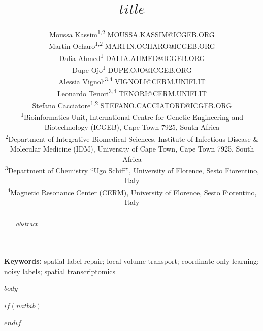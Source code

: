 \documentclass[twoside,11pt]{article}
\begin{document}
\raggedbottom

\title{$title$}

\author{%
\name Moussa Kassim\textsuperscript{1,2} \email MOUSSA.KASSIM@ICGEB.ORG \\
\name Martin Ocharo\textsuperscript{1,2} \email MARTIN.OCHARO@ICGEB.ORG \\
\name Dalia Ahmed\textsuperscript{1} \email DALIA.AHMED@ICGEB.ORG \\
\name Dupe Ojo\textsuperscript{1} \email DUPE.OJO@ICGEB.ORG \\
\name Alessia Vignoli\textsuperscript{3,4} \email VIGNOLI@CERM.UNIFI.IT \\
\name Leonardo Tenori\textsuperscript{3,4} \email TENORI@CERM.UNIFI.IT \\
\name Stefano Cacciatore\textsuperscript{1,2} \email STEFANO.CACCIATORE@ICGEB.ORG \\
\addr \textsuperscript{1}Bioinformatics Unit, International Centre for Genetic
Engineering and Biotechnology (ICGEB), Cape Town 7925, South Africa \\
\addr \textsuperscript{2}Department of Integrative Biomedical Sciences,
Institute of Infectious Disease \& Molecular Medicine (IDM), University of Cape
Town, Cape Town 7925, South Africa \\
\addr \textsuperscript{3}Department of Chemistry ``Ugo Schiff'', University of
Florence, Sesto Fiorentino, Italy \\
\addr \textsuperscript{4}Magnetic Resonance Center (CERM), University of Florence,
Sesto Fiorentino, Italy}

\maketitle

\begin{abstract}
$abstract$
\end{abstract}

\textbf{Keywords:} spatial-label repair; local-volume transport; coordinate-only learning; noisy labels; spatial transcriptomics

$body$

$if(natbib)$

$endif$
\end{document}

